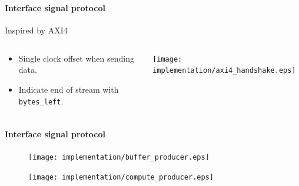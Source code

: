 \begin{frame}[fragile]
    \frametitle{\ImplementationTitle}
    \framesubtitle{Interface signal protocol}
    Inspired by AXI4\\
    \begin{columns}
        \begin{column}{0.4\textwidth}
           \begin{itemize}
               \item Single clock offset when sending data.
               \item Indicate end of stream with \texttt{bytes\_left}.
           \end{itemize}
        \end{column}
        \begin{column}{0.5\textwidth}  %
            \texttt{[image: implementation/axi4\_handshake.eps]}
        \end{column}
    \end{columns}
\end{frame}


\begin{frame}[fragile]
    \frametitle{\ImplementationTitle}
    \framesubtitle{Interface signal protocol}
    \begin{minipage}[t]{0.5\textwidth}
        \begin{figure}
                \centering
                \texttt{[image: implementation/buffer\_producer.eps]}
        \end{figure}
    \end{minipage}%
    \hfill%
    \begin{minipage}[t]{0.5\textwidth}
        \begin{figure}
                \centering
                \texttt{[image: implementation/compute\_producer.eps]}
        \end{figure}
    \end{minipage}
\end{frame}





